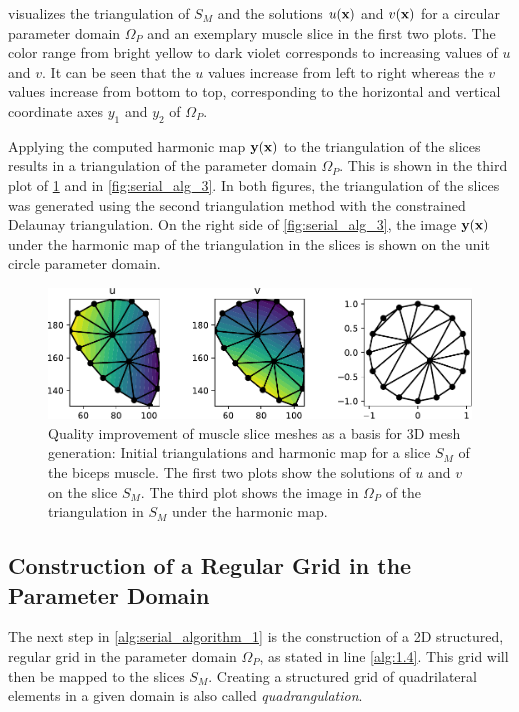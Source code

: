  visualizes the triangulation of $S_M$ and the solutions $u(\textbf{x})$ and $v(\textbf{x})$ for a circular parameter domain $\Omega_P$ and an exemplary muscle slice in the first two plots. The color range from bright yellow to dark violet corresponds to increasing values of $u$ and $v$. It can be seen that the $u$ values increase from left to right whereas the $v$ values increase from bottom to top, corresponding to the horizontal and vertical coordinate axes $y_1$ and $y_2$ of $\Omega_P$.


Applying the computed harmonic map $\textbf{y}(\textbf{x})$ to the triangulation of the slices results in a triangulation of the parameter domain $\Omega_P$. This is shown in the third plot of \cref{fig:harmonic_map_solution} and in \cref{fig:serial_alg_3}.
In both figures, the triangulation of the slices was generated using the second triangulation method with the constrained Delaunay triangulation. On the right side of \cref{fig:serial_alg_3}, the image $\textbf{y}(\textbf{x})$ under the harmonic map of the triangulation in the slices is shown on the unit circle parameter domain.

\begin{figure}%
  \centering%
  \includegraphics[width=\textwidth]{images/fiber_creation/harmonic_map_9b.pdf}%
  \caption{Quality improvement of muscle slice meshes as a basis for 3D mesh generation: Initial triangulations and harmonic map for a slice $S_M$ of the biceps muscle. The first two plots show the solutions of $u$ and $v$ on the slice $S_M$. The third plot shows the image in $\Omega_P$ of the triangulation in $S_M$ under the harmonic map.}%
  \label{fig:harmonic_map_solution}%
\end{figure}%

\subsection{Construction of a Regular Grid in the Parameter Domain}
The next step in \cref{alg:serial_algorithm_1} is the construction of a 2D structured, regular grid in the parameter domain $\Omega_P$, as stated in line \ref{alg:1.4}. This grid will then be mapped to the slices $S_M$. Creating a structured grid of quadrilateral elements in a given domain is also called \emph{quadrangulation}.

